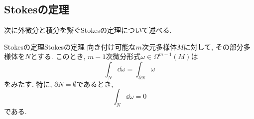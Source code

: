 \documentclass[../main.tex]{subfiles}
\begin{document}
    \subsection{Stokesの定理}
        次に外微分と積分を繋ぐStokesの定理について述べる.
        \begin{dfn}{Stokesの定理}{Stokesの定理}
            向き付け可能な$m$次元多様体$M$に対して, その部分多様体を$N$とする.
            このとき, $m-1$次微分形式$\omega\in\Omega^{m-1}(M)$は
            \begin{equation}
                \int_N \dd{\omega} = \int_{\partial N} \omega
            \end{equation}
            をみたす. 特に, $\partial N =\emptyset$であるとき,
            \begin{equation}
                \int_N \dd{\omega} = 0
            \end{equation}
            である.
        \end{dfn}
\end{document}
